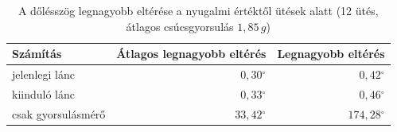 \begin{table}[htbp]
  \centering
  \small
  \begin{tabular}{@{}lrr@{}}
    \toprule
    Számítás & Átlagos legnagyobb eltérés & Legnagyobb eltérés \\
    \midrule
    jelenlegi lánc & $0{,}30$$^\circ$ & $0{,}42$$^\circ$ \\
    kiinduló lánc & $0{,}33$$^\circ$ & $0{,}46$$^\circ$ \\
    csak gyorsulásmérő & $33{,}42$$^\circ$ & $174{,}28$$^\circ$ \\
    \bottomrule
  \end{tabular}
  \caption{A dőlésszög legnagyobb eltérése a nyugalmi értéktől ütések alatt (12 ütés, átlagos csúcsgyorsulás $1{,}85$\,$g$)}
  \label{tab:utes}
\end{table}
